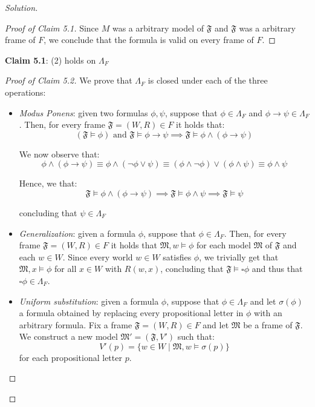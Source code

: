 \documentclass[12pt,a4paper]{report}
\theoremstyle{definition}
\newcommand{\model}[1]{\mathfrak{#1}}           %
\begin{document}
\begin{proof}[Solution]
\begin{proof}[Proof of Claim 5.1]
            Since $M$ was a arbitrary model of $\model{F}$ and $\model{F}$ was a arbitrary frame of $F$, we conclude that the formula is valid on every frame of $F$.
        \end{proof}

        \textbf{Claim 5.1}: (2) holds on $\Lambda_{F}$
        
        \begin{proof}[Proof of Claim 5.2]
            We prove that $\Lambda_{F}$ is closed under each of the three operations:
            \begin{itemize}
                \item \textit{Modus Ponens}: given two formulas $\phi, \psi$, suppose that $\phi \in \Lambda_{F}$ and $\phi \to \psi \in \Lambda_F$. Then, for every frame $\model{F} = (W,R) \in F$ it holds that:
                \[(\model{F} \models \phi) \text{ and } \model{F} \models \phi \to \psi \implies \model{F} \models \phi \land (\phi \to \psi)\]
    
                We now observe that:
                \[\phi \land (\phi \to \psi) \equiv \phi \land (\lnot \phi \lor \psi) \equiv (\phi \land \lnot \phi) \lor (\phi \land \psi) \equiv \phi \land \psi\]
    
                Hence, we that:
                \[\model{F} \models \phi \land (\phi \to \psi) \implies \model{F} \models \phi \land \psi \implies \model{F} \models \psi\]
    
                concluding that $\psi \in \Lambda_F$

                \item \textit{Generalization}: given a formula $\phi$, suppose that $\phi \in \Lambda_{F}$. Then, for every frame $\model{F} = (W,R) \in F$ it holds that $\model{M}, w \models \phi$ for each model $\model{M}$ of $\model{F}$ and each $w \in W$. Since every world $w \in W$ satisfies $\phi$, we trivially get that $\model{M}, x \models \phi$ for all $x \in W$ with $R(w,x)$, concluding that $\model{F} \models \square \phi$ and thus that $\square \phi \in \Lambda_{F}$.
                
                \item \textit{Uniform substitution}: given a formula $\phi$, suppose that $\phi \in \Lambda_{F}$ and let $\sigma(\phi)$ a formula obtained by replacing every propositional letter in $\phi$ with an arbitrary formula. Fix a frame $\model{F} = (W,R) \in F$ and let $\model{M}$ be a frame of $\model{F}$. We construct a new model $\model{M'} = (\model{F}, V')$ such that:
                \[V'(p) = \{w \in W \mid \model{M}, w \models \sigma(p)\}\]
                for each propositional letter $p$.
                

\end{itemize}
\end{proof}
\end{proof}
\end{document}
